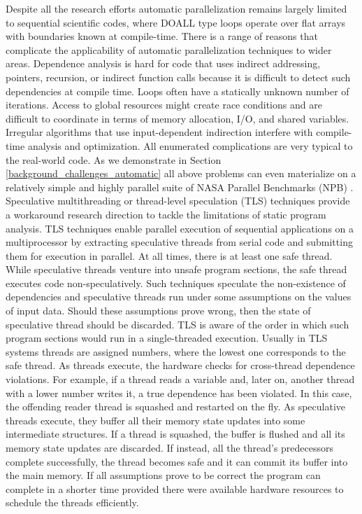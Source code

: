 \quad Despite all the research efforts automatic parallelization remains largely limited to sequential scientific codes, where DOALL type loops operate over flat arrays with boundaries known at compile-time. There is a range of reasons that complicate the applicability of automatic parallelization techniques to wider areas. Dependence analysis is hard for code that uses indirect addressing, pointers, recursion, or indirect function calls because it is difficult to detect such dependencies at compile time. Loops often have a statically unknown number of iterations. Access to global resources might create race conditions and are difficult to coordinate in terms of memory allocation, I/O, and shared variables. Irregular algorithms that use input-dependent indirection interfere with compile-time analysis and optimization. All enumerated complications are very typical to the real-world code. As we demonstrate in Section \ref{background_challenges_automatic} all above problems can even materialize on a relatively simple and highly parallel suite of NASA Parallel Benchmarks (NPB) \cite{nasa-parallel-benchmarks}.\newline\null
\quad Speculative multithreading or thread-level speculation (TLS) techniques provide a workaround research direction to tackle the limitations of static program analysis. TLS techniques enable parallel execution of sequential applications on a multiprocessor by extracting speculative threads from serial code and submitting them for execution in parallel. At all times, there is at least one safe thread. While speculative threads venture into unsafe program sections, the safe thread executes code non-speculatively. Such techniques speculate the non-existence of dependencies \cite{10.1145/291069.291020} and speculative threads run under some assumptions on the values of input data. Should these assumptions prove wrong, then the state of speculative thread should be discarded. TLS is aware of the order in which such program sections would run in a single-threaded execution. Usually in TLS systems threads are assigned numbers, where the lowest one corresponds to the safe thread. As threads execute, the hardware checks for cross-thread dependence violations. For example, if a thread reads a variable and, later on, another thread with a lower number writes it, a true dependence has been violated. In this case, the offending reader thread is squashed and restarted on the fly. As speculative threads execute, they buffer all their memory state updates into some intermediate structures. If a thread is squashed, the buffer is flushed and all its memory state updates are discarded. If instead, all the thread’s predecessors complete successfully, the thread becomes safe and it can commit its buffer into the main memory. If all assumptions prove to be correct the program can complete in a shorter time provided there were available hardware resources to schedule the threads efficiently.\newline\null
